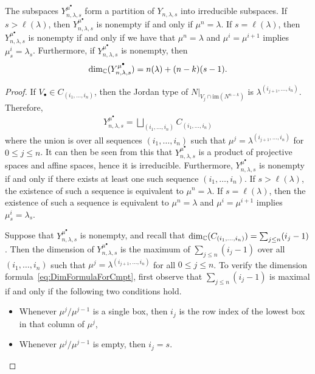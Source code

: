 \documentclass[12pt]{amsart}
\newcommand{\la}{\lambda}
\newcommand{\im}{\mathrm{im}}
\begin{document}
\begin{lemma}
The subspaces $Y_{n,\la,s}^{\mu^\bullet}$ form a partition of $Y_{n,\la,s}$ into irreducible subspaces. If $s>\ell(\la)$, then $Y_{n,\la,s}^{\mu^\bullet}$ is nonempty if and only if $\mu^{n} = \la$. If $s = \ell(\la)$, then $Y_{n,\la,s}^{\mu^\bullet}$ is nonempty if and only if we have that $\mu^{n} = \la$ and $\mu^{i} = \mu^{i+1}$ implies $\mu^{i}_s = \la_s$. Furthermore, if $Y_{n,\la,s}^{\mu^\bullet}$ is nonempty, then
\begin{align}\label{eq:DimFormulaForCmpt}
\dim_\bC(Y_{n,\la,s}^{\mu^\bullet}) = n(\la) + (n-k)(s-1).
\end{align}
\end{lemma}

\begin{proof}
If $V_\bullet\in C_{(i_1,\dots, i_n)}$, then the Jordan type of $N|_{V_j\cap \im(N^{n-k})}$ is $\la^{(i_{j+1},\dots, i_n)}$. Therefore,
\begin{align}
Y_{n,\la,s}^{\mu^\bullet} = \bigsqcup_{(i_1,\dots, i_n)} C_{(i_1,\dots, i_n)}
\end{align}
where the union is over all sequences $(i_1,\dots, i_n)$ such that $\mu^{j} = \la^{(i_{j+1},\dots, i_n)}$ for $0\leq j \leq n$. It can then be seen from this that $Y_{n,\la,s}^{\mu^\bullet}$ is a product of projective spaces and affine spaces, hence it is irreducible. Furthermore, $Y_{n,\la,s}^{\mu^\bullet}$ is nonempty if and only if there exists at least one such sequence $(i_1,\dots, i_n)$. If $s>\ell(\la)$, the existence of such a sequence is equivalent to $\mu^n = \la$. If $s=\ell(\la)$, then the existence of such a sequence is equivalent to $\mu^n=\la$ and $\mu^i = \mu^{i+1}$ implies $\mu^i_s = \la_s$.

Suppose that $Y_{n,\la,s}^{\mu^\bullet}$ is nonempty, and recall that $\dim_{\mathbb{C}} (C_{(i_1,\dots, i_n)}) = \sum_{j\leq n} (i_j-1)$. Then the dimension of $Y_{n,\la,s}^{\mu^\bullet}$ is the maximum of $\sum_{j\leq n} (i_j-1)$ over all $(i_1,\dots, i_n)$ such that $\mu^{j} = \la^{(i_{j+1},\dots, i_n)}$ for all $0\leq j \leq n$. To verify the dimension formula~\eqref{eq:DimFormulaForCmpt}, first observe that $\sum_{j\leq n}(i_j-1)$ is maximal if and only if the following two conditions hold.
\begin{itemize}
\item Whenever $\mu^j/\mu^{j-1}$ is a single box, then $i_j$ is the row index of the lowest box in that column of $\mu^j$,
\item Whenever $\mu^j/\mu^{j-1}$ is empty, then $i_j = s$.
\end{itemize}

\end{proof}
\end{document}
